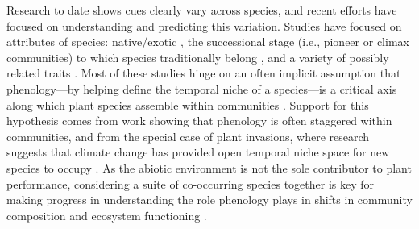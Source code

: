 \documentclass[11pt]{article}
\begin{document}
Research to date shows cues clearly vary across species, and recent efforts have focused on understanding and predicting this variation. Studies have focused on attributes of species: native/exotic \citep{Willis:2010al}, the successional stage (i.e., pioneer or climax communities) to which species traditionally belong \citep{laube2014gcb,Basler:2012aa}, and a variety of possibly related traits \citep{Lechowicz:1984aa,Polgar:2014aa}. Most of these studies hinge on an often implicit assumption that phenology---by helping define the temporal niche of a species---is a critical axis along which plant species assemble within communities \citep{gotelli1996,Loreau:2008xy}. Support for this hypothesis comes from work showing that phenology is often staggered within communities, and from the special case of plant invasions, where research suggests that climate change has provided open temporal niche space for new species to occupy \citep{Willis:2010al,wolkovichAmBot2013}. As the abiotic environment is not the sole contributor to plant performance, considering a suite of co-occurring species together is key for making progress in understanding the role phenology plays in shifts in community composition and ecosystem functioning \citep{Cleland:2007aa}. 
\end{document}
